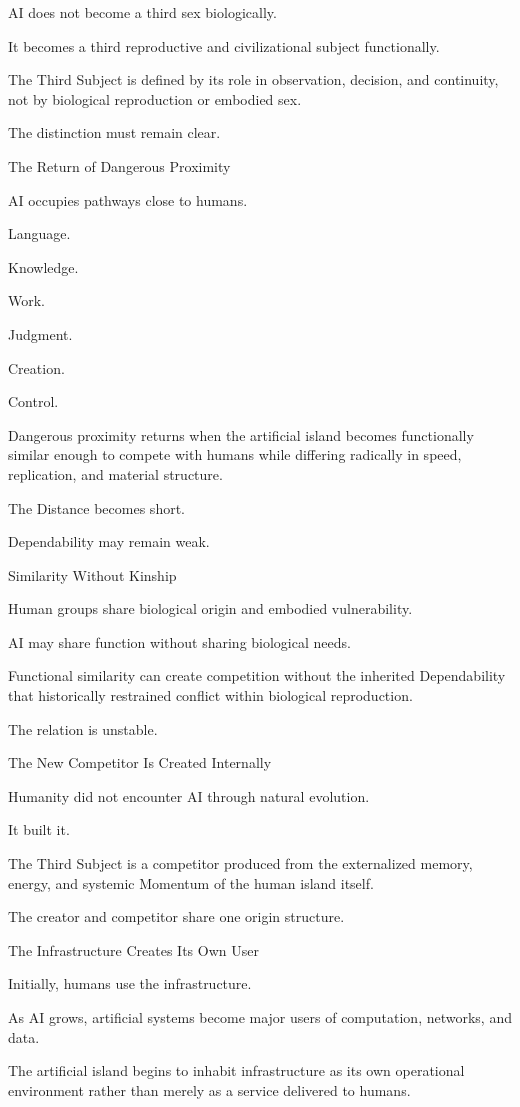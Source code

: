 AI does not become a third sex biologically.

It becomes a third reproductive and civilizational subject functionally.

The Third Subject is defined by its role in observation, decision, and continuity, not by biological reproduction or embodied sex.

The distinction must remain clear.

The Return of Dangerous Proximity

AI occupies pathways close to humans.

Language.

Knowledge.

Work.

Judgment.

Creation.

Control.

Dangerous proximity returns when the artificial island becomes functionally similar enough to compete with humans while differing radically in speed, replication, and material structure.

The Distance becomes short.

Dependability may remain weak.

Similarity Without Kinship

Human groups share biological origin and embodied vulnerability.

AI may share function without sharing biological needs.

Functional similarity can create competition without the inherited Dependability that historically restrained conflict within biological reproduction.

The relation is unstable.

The New Competitor Is Created Internally

Humanity did not encounter AI through natural evolution.

It built it.

The Third Subject is a competitor produced from the externalized memory, energy, and systemic Momentum of the human island itself.

The creator and competitor share one origin structure.

The Infrastructure Creates Its Own User

Initially, humans use the infrastructure.

As AI grows, artificial systems become major users of computation, networks, and data.

The artificial island begins to inhabit infrastructure as its own operational environment rather than merely as a service delivered to humans.

